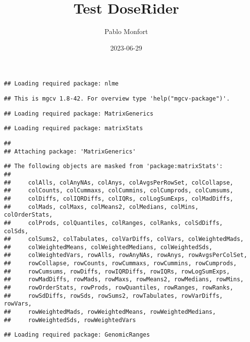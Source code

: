 \documentclass[
]{article}
\title{Test DoseRider}
\author{Pablo Monfort}
\date{2023-06-29}
\begin{document}
\maketitle

\begin{verbatim}
## Loading required package: nlme
\end{verbatim}

\begin{verbatim}
## This is mgcv 1.8-42. For overview type 'help("mgcv-package")'.
\end{verbatim}

\begin{verbatim}
## Loading required package: MatrixGenerics
\end{verbatim}

\begin{verbatim}
## Loading required package: matrixStats
\end{verbatim}

\begin{verbatim}
## 
## Attaching package: 'MatrixGenerics'
\end{verbatim}

\begin{verbatim}
## The following objects are masked from 'package:matrixStats':
## 
##     colAlls, colAnyNAs, colAnys, colAvgsPerRowSet, colCollapse,
##     colCounts, colCummaxs, colCummins, colCumprods, colCumsums,
##     colDiffs, colIQRDiffs, colIQRs, colLogSumExps, colMadDiffs,
##     colMads, colMaxs, colMeans2, colMedians, colMins, colOrderStats,
##     colProds, colQuantiles, colRanges, colRanks, colSdDiffs, colSds,
##     colSums2, colTabulates, colVarDiffs, colVars, colWeightedMads,
##     colWeightedMeans, colWeightedMedians, colWeightedSds,
##     colWeightedVars, rowAlls, rowAnyNAs, rowAnys, rowAvgsPerColSet,
##     rowCollapse, rowCounts, rowCummaxs, rowCummins, rowCumprods,
##     rowCumsums, rowDiffs, rowIQRDiffs, rowIQRs, rowLogSumExps,
##     rowMadDiffs, rowMads, rowMaxs, rowMeans2, rowMedians, rowMins,
##     rowOrderStats, rowProds, rowQuantiles, rowRanges, rowRanks,
##     rowSdDiffs, rowSds, rowSums2, rowTabulates, rowVarDiffs, rowVars,
##     rowWeightedMads, rowWeightedMeans, rowWeightedMedians,
##     rowWeightedSds, rowWeightedVars
\end{verbatim}

\begin{verbatim}
## Loading required package: GenomicRanges
\end{verbatim}
\end{document}
